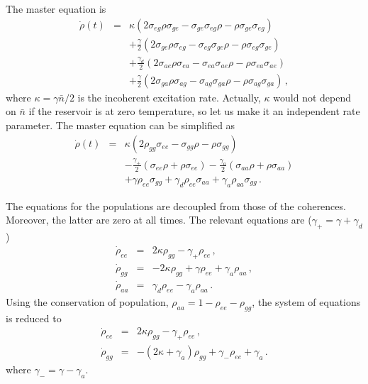 \documentclass[twocolumn,aps,eqsecnum,showkeys,amsmath]{revtex4-2}
\begin{document}
The master equation is 
%
\begin{eqnarray}
\dot{\rho}(t) &=&  \kappa (2\sigma_{eg} \rho \sigma_{ge} 
  	-\sigma_{ge} \sigma_{eg} \rho  -\rho \sigma_{ge} \sigma_{eg})     
  	\nonumber \\
&&+\frac{\gamma}{2} (2\sigma_{ge} \rho \sigma_{eg} 
  	-\sigma_{eg} \sigma_{ge} \rho  -\rho \sigma_{eg} \sigma_{ge})     
  	\nonumber \\
&& + \frac{\gamma_d}{2} (2\sigma_{ae} \rho \sigma_{ea} 
  	-\sigma_{ea} \sigma_{ae} \rho -\rho \sigma_{ea} \sigma_{ae}) 	
	\nonumber \\ 
&& +\frac{\gamma}{2} (2\sigma_{ga} \rho \sigma_{ag} 
  	-\sigma_{ag} \sigma_{ga} \rho  -\rho \sigma_{ag} \sigma_{ga}) \,, 
\end{eqnarray}
where $\kappa = \gamma \bar{n}/2$ is the incoherent excitation rate. 
Actually, $\kappa$ would not depend on $\bar{n}$ if the reservoir is at 
zero temperature, so let us make it an independent rate parameter. 
The master equation can be simplified as 
%
\begin{eqnarray}
\dot{\rho}(t) &=& \kappa ( 2 \rho_{gg} \sigma_{ee} -\sigma_{gg} \rho 
	-\rho \sigma_{gg} ) 	\nonumber \\
&& -\frac{\gamma_+}{2} (\sigma_{ee} \rho +\rho \sigma_{ee}) 
    -\frac{\gamma_a}{2} (\sigma_{aa} \rho +\rho \sigma_{aa}) 
        \nonumber \\
&& +\gamma \rho_{ee} \sigma_{gg}  +\gamma_d \rho_{ee} \sigma_{aa}    
    +\gamma_a \rho_{aa} \sigma_{gg}  \,.     \label{masterEqInc}
\end{eqnarray}

The equations for the populations are decoupled from those of the 
coherences. Moreover, the latter are zero at all times. The relevant 
equations are ($\gamma_+ = \gamma + \gamma_d$)
%
\begin{subequations}
\begin{eqnarray}
\dot{\rho}_{ee} &=& 2\kappa \rho_{gg} -\gamma_+ \rho_{ee} 	\,, \\ 
\dot{\rho}_{gg} &=& -2\kappa \rho_{gg} +\gamma \rho_{ee} 
	+\gamma_a \rho_{aa} 	\,, \\  
\dot{\rho}_{aa} &=& \gamma_d \rho_{ee} -\gamma_a \rho_{aa} 	\,.
\end{eqnarray}
\end{subequations}
Using the conservation of population, $\rho_{aa} = 1- \rho_{ee} -\rho_{gg}$, 
the system of equations is reduced to 
%
\begin{subequations}
\begin{eqnarray}
\dot{\rho}_{ee} &=& 2\kappa \rho_{gg} -\gamma_+ \rho_{ee} 	\,, \\ 
\dot{\rho}_{gg} &=& -(2\kappa +\gamma_a) \rho_{gg} 
	+\gamma_- \rho_{ee} +\gamma_a  	 	\,.
\end{eqnarray}
\end{subequations}
where $\gamma_- = \gamma -\gamma_a$. 
\end{document}
